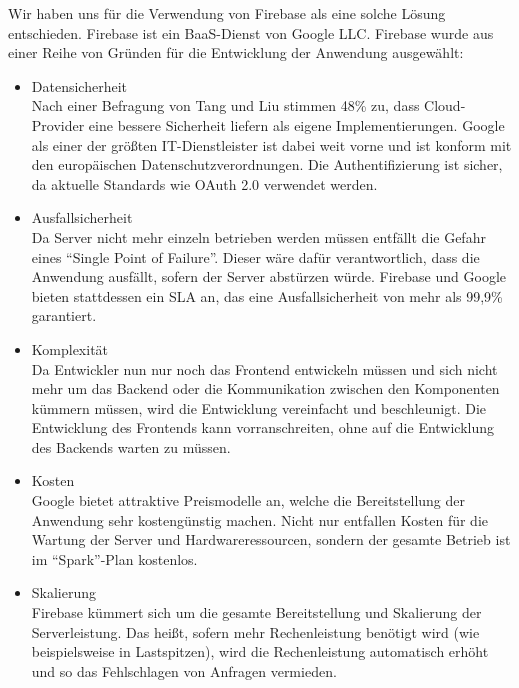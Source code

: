 Wir haben uns für die Verwendung von Firebase als eine solche Lösung entschieden.
Firebase ist ein \ac{BaaS}-Dienst von Google LLC.
Firebase wurde aus einer Reihe von Gründen für die Entwicklung der Anwendung ausgewählt:
\begin{itemize}
    \item Datensicherheit\\
        Nach einer Befragung von Tang und Liu stimmen 48\% zu, dass Cloud-Provider eine bessere Sicherheit liefern als eigene Implementierungen.\autocite[S. 63]{TANG}
        Google als einer der größten IT-Dienstleister ist dabei weit vorne und ist konform mit den europäischen Datenschutzverordnungen.\autocite{firebaseDataprotection}
        Die Authentifizierung ist sicher, da aktuelle Standards wie OAuth 2.0 verwendet werden.
    \item Ausfallsicherheit\\
        Da Server nicht mehr einzeln betrieben werden müssen entfällt die Gefahr eines \enquote{Single Point of Failure}. %
        Dieser wäre dafür verantwortlich, dass die Anwendung ausfällt, sofern der Server abstürzen würde.
        Firebase und Google bieten stattdessen ein \ac{SLA} an, das eine Ausfallsicherheit von mehr als 99,9\% garantiert.\autocite{firebaseSLA}
    \item Komplexität\\
        Da Entwickler nun nur noch das Frontend entwickeln müssen und sich nicht mehr um das Backend oder die Kommunikation zwischen den Komponenten kümmern müssen, wird die Entwicklung vereinfacht und beschleunigt.
        Die Entwicklung des Frontends kann vorranschreiten, ohne auf die Entwicklung des Backends warten zu müssen.
    \item Kosten \\
        Google bietet attraktive Preismodelle an, welche die Bereitstellung der Anwendung sehr kostengünstig machen.
        Nicht nur entfallen Kosten für die Wartung der Server und Hardwareressourcen, sondern der gesamte Betrieb ist im \enquote{Spark}-Plan kostenlos.
    \item Skalierung \\
        Firebase kümmert sich um die gesamte Bereitstellung und Skalierung der Serverleistung.
        Das heißt, sofern mehr Rechenleistung benötigt wird (wie beispielsweise in Lastspitzen), wird die Rechenleistung automatisch erhöht und so das Fehlschlagen von Anfragen vermieden.
\end{itemize}




















